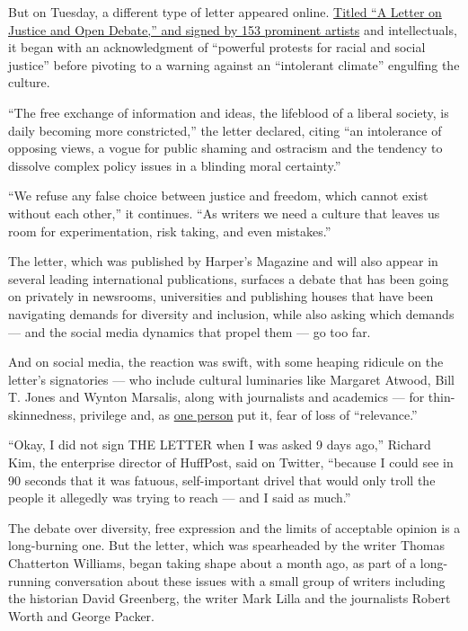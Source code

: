 But on Tuesday, a different type of letter appeared online.
\href{https://harpers.org/a-letter-on-justice-and-open-debate/}{Titled
``A Letter on Justice and Open Debate,'' and signed by 153 prominent
artists} and intellectuals, it began with an acknowledgment of
``powerful protests for racial and social justice'' before pivoting to a
warning against an ``intolerant climate'' engulfing the culture.

``The free exchange of information and ideas, the lifeblood of a liberal
society, is daily becoming more constricted,'' the letter declared,
citing ``an intolerance of opposing views, a vogue for public shaming
and ostracism and the tendency to dissolve complex policy issues in a
blinding moral certainty.''

``We refuse any false choice between justice and freedom, which cannot
exist without each other,'' it continues. ``As writers we need a culture
that leaves us room for experimentation, risk taking, and even
mistakes.''

The letter, which was published by Harper's Magazine and will also
appear in several leading international publications, surfaces a debate
that has been going on privately in newsrooms, universities and
publishing houses that have been navigating demands for diversity and
inclusion, while also asking which demands --- and the social media
dynamics that propel them --- go too far.

And on social media, the reaction was swift, with some heaping ridicule
on the letter's signatories --- who include cultural luminaries like
Margaret Atwood, Bill T. Jones and Wynton Marsalis, along with
journalists and academics --- for thin-skinnedness, privilege and, as
\href{https://twitter.com/dstfelix/status/1280500908611325958?s=20}{one
person} put it, fear of loss of ``relevance.''

``Okay, I did not sign THE LETTER when I was asked 9 days ago,'' Richard
Kim, the enterprise director of HuffPost, said on Twitter, ``because I
could see in 90 seconds that it was fatuous, self-important drivel that
would only troll the people it allegedly was trying to reach --- and I
said as much.''

The debate over diversity, free expression and the limits of acceptable
opinion is a long-burning one. But the letter, which was spearheaded by
the writer Thomas Chatterton Williams, began taking shape about a month
ago, as part of a long-running conversation about these issues with a
small group of writers including the historian David Greenberg, the
writer Mark Lilla and the journalists Robert Worth and George Packer.

